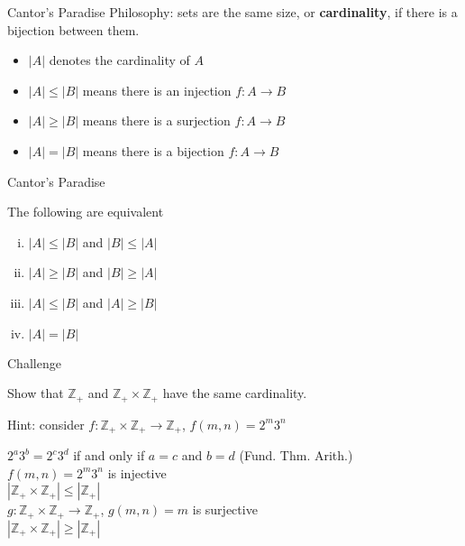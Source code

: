 \documentclass{beamer}
\begin{document}
\begin{frame}{Cantor's Paradise}
Philosophy: sets are the same size, or \textbf{cardinality}, if there is a bijection between them.
\begin{itemize}
\pause 
\item $|A|$ denotes the cardinality of $A$
\pause 
\item $|A| \leq |B|$ means there is an injection $f: A\rightarrow B$
\pause 
\item $|A| \geq |B|$ means there is a surjection $f: A\rightarrow B$
\pause 
\item $|A| = |B|$ means there is a bijection $f: A\rightarrow B$
\end{itemize}
\pause
\end{frame}

\begin{frame}{Cantor's Paradise}
\begin{thm}
The following are equivalent
\begin{enumerate}[(i)]
\item $|A|\leq |B|$  and $|B|\leq |A|$
\item $|A|\geq |B|$  and $|B|\geq |A|$
\item $|A|\leq |B|$  and $|A|\geq |B|$
\item $|A|= |B|$
\end{enumerate}
\end{thm}
\end{frame}

\begin{frame}{Challenge}
\begin{prob}
Show that $\mathbb{Z}_+$ and $\mathbb{Z}_+\times\mathbb{Z}_+$ have the same cardinality.
\end{prob}
\pause
Hint: consider $f: \mathbb{Z}_+\times\mathbb{Z}_+\rightarrow\mathbb{Z}_+$, $f(m,n) = 2^m3^n$
\begin{soln}
\pause
$2^a3^b = 2^c3^d$ if and only if $a=c$ and $b=d$ (Fund. Thm. Arith.)\\
\pause
$f(m,n) = 2^m3^n$ is injective\\
\pause
$|\mathbb{Z}_+\times\mathbb{Z}_+|\leq |\mathbb{Z}_+|$\\
\pause
$g: \mathbb{Z}_+\times\mathbb{Z}_+\rightarrow\mathbb{Z}_+$, $g(m,n) = m$ is surjective\\
\pause
$|\mathbb{Z}_+\times\mathbb{Z}_+|\geq |\mathbb{Z}_+|$
\end{soln}
\end{frame}
\end{document}
